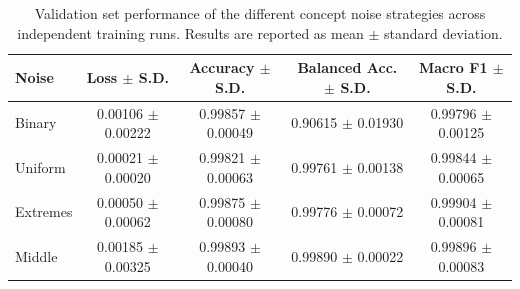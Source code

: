 \begin{table}[t]
\centering
\begin{tabular}{l c c c c}
\toprule
Noise & Loss $\pm$ S.D. & Accuracy $\pm$ S.D. & Balanced Acc. $\pm$ S.D. & Macro F1 $\pm$ S.D. \\
\midrule
Binary & 0.00106 $\pm$ 0.00222 & 0.99857 $\pm$ 0.00049 & 0.90615 $\pm$ 0.01930 & 0.99796 $\pm$ 0.00125 \\
Uniform & 0.00021 $\pm$ 0.00020 & 0.99821 $\pm$ 0.00063 & 0.99761 $\pm$ 0.00138 & 0.99844 $\pm$ 0.00065 \\
Extremes & 0.00050 $\pm$ 0.00062 & 0.99875 $\pm$ 0.00080 & 0.99776 $\pm$ 0.00072 & 0.99904 $\pm$ 0.00081 \\
Middle & 0.00185 $\pm$ 0.00325 & 0.99893 $\pm$ 0.00040 & 0.99890 $\pm$ 0.00022 & 0.99896 $\pm$ 0.00083 \\
\bottomrule
\end{tabular}
\caption{Validation set performance of the different concept noise strategies across independent training runs. Results are reported as mean $\pm$ standard deviation.}
\label{tab:noise_selection_hn}
\end{table}